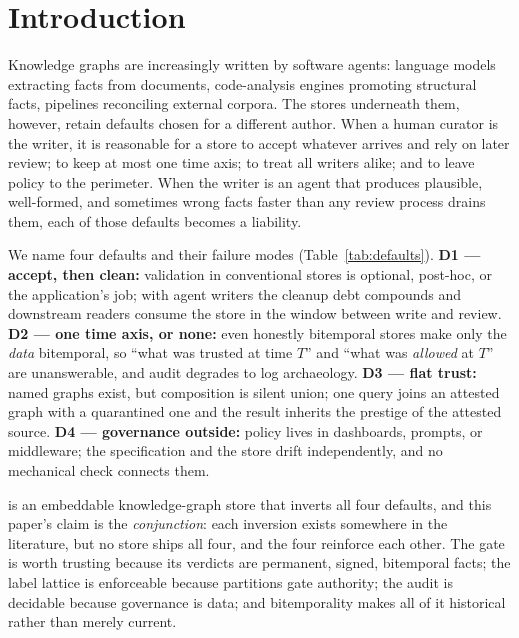 \section{Introduction}
\label{sec:intro}

Knowledge graphs are increasingly written by software agents: language
models extracting facts from documents, code-analysis engines promoting
structural facts, pipelines reconciling external corpora. The stores
underneath them, however, retain defaults chosen for a different
author. When a human curator is the writer, it is reasonable for a
store to accept whatever arrives and rely on later review; to keep at
most one time axis; to treat all writers alike; and to leave policy to
the perimeter. When the writer is an agent that produces plausible,
well-formed, and sometimes wrong facts faster than any review process
drains them, each of those defaults becomes a liability.

We name four defaults and their failure modes
(Table~\ref{tab:defaults}). \textbf{D1 --- accept, then clean:}
validation in conventional stores is optional, post-hoc, or the
application's job; with agent writers the cleanup debt compounds and
downstream readers consume the store in the window between write and
review. \textbf{D2 --- one time axis, or none:} even honestly bitemporal
stores make only the \emph{data} bitemporal, so ``what was trusted at
time $T$'' and ``what was \emph{allowed} at $T$'' are unanswerable, and
audit degrades to log archaeology. \textbf{D3 --- flat trust:} named
graphs exist, but composition is silent union; one query joins an
attested graph with a quarantined one and the result inherits the
prestige of the attested source. \textbf{D4 --- governance outside:}
policy lives in dashboards, prompts, or middleware; the specification
and the store drift independently, and no mechanical check connects
them.

\sys is an embeddable knowledge-graph store that inverts all four
defaults, and this paper's claim is the \emph{conjunction}: each
inversion exists somewhere in the literature, but no store ships all
four, and the four reinforce each other. The gate is worth trusting
because its verdicts are permanent, signed, bitemporal facts; the
label lattice is enforceable because partitions gate authority; the
audit is decidable because governance is data; and bitemporality makes
all of it historical rather than merely current.

